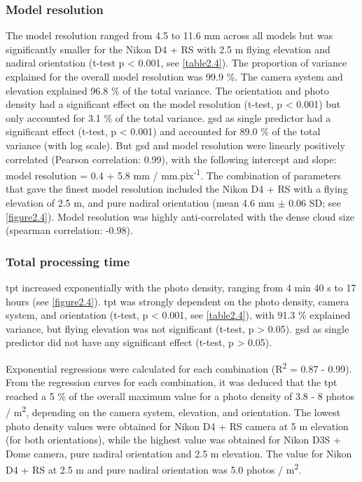 \subsubsection{Model resolution}\label{chapitre2_3.1.3}
The model resolution ranged from 4.5 to 11.6 mm across all models but was significantly smaller for the Nikon D4 + RS with 2.5 m flying elevation and nadiral orientation (t-test p < 0.001, see \autoref{table2.4}). The proportion of variance explained for the overall model resolution was 99.9 \%. The camera system and elevation explained 96.8 \% of the total variance. The orientation and photo density had a significant effect on the model resolution (t-test, p < 0.001) but only accounted for 3.1 \% of the total variance. \acrshort{gsd} as single predictor had a significant effect (t-test, p < 0.001) and accounted for 89.0 \% of the total variance (with log scale). But \acrshort{gsd} and model resolution were linearly positively correlated (Pearson correlation: 0.99), with the following intercept and slope: model resolution = 0.4 + 5.8 mm / mm.pix\textsuperscript{-1}. The combination of parameters that gave the finest model resolution included the Nikon D4 + RS with a flying elevation of 2.5 m, and pure nadiral orientation (mean 4.6 mm $\pm$ 0.06 SD; see \autoref{figure2.4}). Model resolution was highly anti-correlated with the dense cloud size (spearman correlation: -0.98).

\subsubsection{Total processing time}\label{chapitre2_3.1.4}
\acrshort{tpt} increased exponentially with the photo density, ranging from 4 min 40 s to 17 hours (see \autoref{figure2.4}). \acrshort{tpt} was strongly dependent on the photo density, camera system, and orientation (t-test, p < 0.001, see \autoref{table2.4}), with 91.3 \% explained variance, but flying elevation was not significant (t-test, p > 0.05). \acrshort{gsd} as single predictor did not have any significant effect (t-test, p > 0.05).

Exponential regressions were calculated for each combination (R\textsuperscript{2} = 0.87 - 0.99). From the regression curves for each combination, it was deduced that the \acrshort{tpt} reached a 5 \% of the overall maximum value for a photo density of 3.8 - 8 photos / m\textsuperscript{2}, depending on the camera system, elevation, and orientation. The lowest photo density values were obtained for Nikon D4 + RS camera at 5 m elevation (for both orientations), while the highest value was obtained for Nikon D3S + Dome camera, pure nadiral orientation and 2.5 m elevation. The value for Nikon D4 + RS at 2.5 m and pure nadiral orientation was 5.0 photos / m\textsuperscript{2}.

